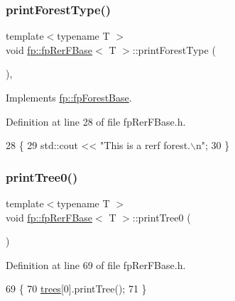\subsubsection{\texorpdfstring{print\+Forest\+Type()}{printForestType()}}
{\footnotesize\ttfamily template$<$typename T $>$ \\
void \hyperlink{classfp_1_1fpRerFBase}{fp\+::fp\+Rer\+F\+Base}$<$ T $>$\+::print\+Forest\+Type (\begin{DoxyParamCaption}{ }\end{DoxyParamCaption})\hspace{0.3cm}{\ttfamily [inline]}, {\ttfamily [virtual]}}



Implements \hyperlink{classfp_1_1fpForestBase_a5e200f603cca94bb5d9f357489f07e97}{fp\+::fp\+Forest\+Base}.



Definition at line 28 of file fp\+Rer\+F\+Base.\+h.


\begin{DoxyCode}
28                                   \{
29                 std::cout << \textcolor{stringliteral}{"This is a rerf forest.\(\backslash\)n"};
30             \}
\end{DoxyCode}
\mbox{\label{classfp_1_1fpRerFBase_af55265f8a05b0dd1aab826738cefd628}} 
\subsubsection{\texorpdfstring{print\+Tree0()}{printTree0()}}
{\footnotesize\ttfamily template$<$typename T $>$ \\
void \hyperlink{classfp_1_1fpRerFBase}{fp\+::fp\+Rer\+F\+Base}$<$ T $>$\+::print\+Tree0 (\begin{DoxyParamCaption}{ }\end{DoxyParamCaption})\hspace{0.3cm}{\ttfamily [inline]}}



Definition at line 69 of file fp\+Rer\+F\+Base.\+h.


\begin{DoxyCode}
69                              \{
70                 \hyperlink{classfp_1_1fpRerFBase_a6c2f12312e64e5234fc53741f1bfbe96}{trees}[0].printTree();
71             \}
\end{DoxyCode}
\mbox{\label{classfp_1_1fpRerFBase_a0ea48ea24a8213e49e18b6f24ab45508}} 
